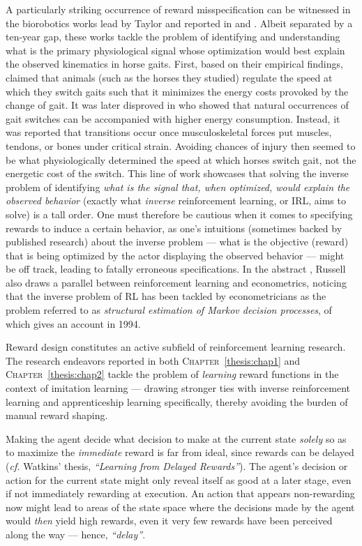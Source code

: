 A particularly striking occurrence of reward misspecification can be witnessed in
the biorobotics works lead by Taylor and reported in \cite{Hoyt1981-ma} and \cite{Farley1991-fd}.
Albeit separated by a ten-year gap, these works tackle the problem of identifying and understanding
what is the primary physiological signal whose optimization would best explain the observed kinematics
in horse gaits. First, based on their empirical findings, \cite{Hoyt1981-ma} claimed that animals (such as
the horses they studied) regulate the speed at which they switch gaits such that it minimizes the energy costs
provoked by the change of gait.
It was later disproved in \cite{Farley1991-fd} who showed that natural occurrences of gait switches can
be accompanied with higher energy consumption. Instead, it was reported that transitions occur once
musculoskeletal forces put muscles, tendons, or bones under critical strain.
Avoiding chances of injury then seemed to be what physiologically determined the speed at which horses switch gait,
not the energetic cost of the switch.
This line of work showcases that solving the inverse problem of identifying
\textit{what is the signal that, when optimized, would explain the observed behavior}
(exactly what \emph{inverse} reinforcement learning, or IRL, aims to solve)
is a tall order.
One must therefore be cautious when it comes to specifying rewards to induce a certain behavior,
as one's intuitions (sometimes backed by published research) about the inverse problem
--- what is the objective (reward) that is being optimized by the actor displaying the observed behavior ---
might be off track,
leading to fatally erroneous specifications.
In the abstract \cite{Russell1998-yk},
Russell also draws a parallel between reinforcement learning and econometrics,
noticing that the inverse problem of RL has been tackled
by econometricians
as the problem referred to as \textit{structural estimation of Markov decision processes},
of which \cite{Rust1994-iw} gives an account in 1994.


Reward design constitutes an active subfield of reinforcement learning research.
The research endeavors reported in
both \textsc{Chapter}~\ref{thesis:chap1} and \textsc{Chapter}~\ref{thesis:chap2}
tackle the problem of \emph{learning} reward functions in the context of imitation learning ---
drawing stronger ties with inverse reinforcement learning and apprenticeship learning specifically,
thereby avoiding the burden of manual reward shaping.

Making the agent decide what decision to make at the current state \emph{solely} so as to
maximize the \emph{immediate} reward is far from ideal, since rewards can be delayed
(\textit{cf.} Watkins' thesis, \textit{``Learning from Delayed Rewards''}).
The agent's decision or action for the current state might only reveal itself as good at a later stage,
even if not immediately rewarding at execution.
An action that appears non-rewarding now might lead to areas of the state space where the decisions made by
the agent would \emph{then} yield high rewards, even it very few rewards have been perceived along the way
--- hence, \textit{``delay''}.

